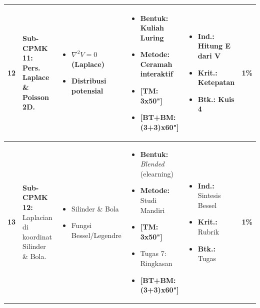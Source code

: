 \documentclass[11pt,a4paper]{article}
\begin{document}
\begin{longtable}{|C{0.6cm}|L{4.2cm}|L{4.5cm}|L{4.5cm}|L{3.5cm}|C{1.1cm}|}
\textbf{12} & \textbf{Sub-CPMK 11:} Pers. Laplace \& Poisson 2D. & \vspace{-4mm} \begin{itemize}[leftmargin=*, noitemsep] \item $\nabla^2 V=0$ (Laplace) \item Distribusi potensial \end{itemize} \vspace{-4mm} & \vspace{-4mm} \begin{itemize}[leftmargin=*, noitemsep] \item \textbf{Bentuk:} Kuliah Luring \item \textbf{Metode:} Ceramah interaktif \item \textbf{[TM: 3x50"]} \item \textbf{[BT+BM: (3+3)x60"]} \end{itemize} \vspace{-4mm} & \vspace{-4mm} \begin{itemize}[leftmargin=*, noitemsep] \item \textbf{Ind.:} Hitung E dari V \item \textbf{Krit.:} Ketepatan \item \textbf{Btk.:} Kuis 4 \end{itemize} \vspace{-4mm} & \textbf{1\%} \\ \hline

\textbf{13} & \textbf{Sub-CPMK 12:} Laplacian di koordinat Silinder \& Bola. & \vspace{-4mm} \begin{itemize}[leftmargin=*, noitemsep] \item Silinder \& Bola \item Fungsi Bessel/Legendre \end{itemize} \vspace{-4mm} & \vspace{-4mm} \begin{itemize}[leftmargin=*, noitemsep] \item \textbf{Bentuk:} \textit{Blended} (elearning) \item \textbf{Metode:} Studi Mandiri \item \textbf{[TM: 3x50"]} \item Tugas 7: Ringkasan \item \textbf{[BT+BM: (3+3)x60"]} \end{itemize} \vspace{-4mm} & \vspace{-4mm} \begin{itemize}[leftmargin=*, noitemsep] \item \textbf{Ind.:} Sintesis Bessel \item \textbf{Krit.:} Rubrik \item \textbf{Btk.:} Tugas \end{itemize} \vspace{-4mm} & \textbf{1\%} \\ \hline


\end{longtable}
\end{document}
